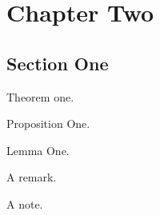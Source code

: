 \chapter{Chapter Two}
\section{Section One}

\begin{theorem}
	Theorem one.
\end{theorem}


\begin{proposition}
	Proposition One.
\end{proposition}

\begin{lemma}
	Lemma One.
\end{lemma}

\begin{remark}
	A remark.
\end{remark}

\begin{note}
	A note.
\end{note}